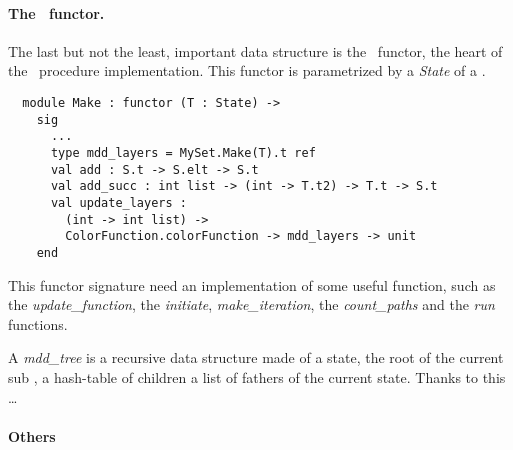 \paragraph{The \mdd\ functor.} The last but not the least, important data structure is the \mdd\ functor, the heart of the \mdd\ procedure implementation. This functor is parametrized by a \textit{State} of a \mdd.

\begin{verbatim}
  module Make : functor (T : State) ->
    sig
      ...
      type mdd_layers = MySet.Make(T).t ref
      val add : S.t -> S.elt -> S.t
      val add_succ : int list -> (int -> T.t2) -> T.t -> S.t
      val update_layers :
        (int -> int list) ->
        ColorFunction.colorFunction -> mdd_layers -> unit
    end
\end{verbatim}

This functor signature need an implementation of some useful function, such as the \textit{update\_function}, the \textit{initiate}, \textit{make\_iteration}, the \textit{count\_paths} and the \textit{run} functions.

A \textit{mdd\_tree} is a recursive data structure made of a state, the root of the current sub \mdd, a hash-table of children a list of fathers of the current state. Thanks to this \dots{}

\paragraph{Others}